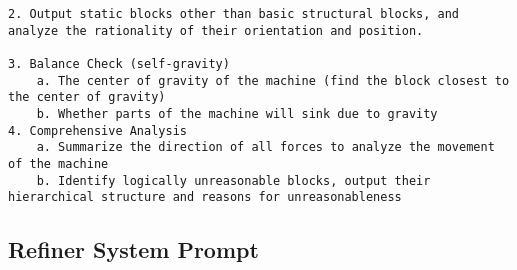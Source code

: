 \begin{lstlisting}
2. Output static blocks other than basic structural blocks, and analyze the rationality of their orientation and position.

3. Balance Check (self-gravity)
    a. The center of gravity of the machine (find the block closest to the center of gravity)
    b. Whether parts of the machine will sink due to gravity
4. Comprehensive Analysis
    a. Summarize the direction of all forces to analyze the movement of the machine
    b. Identify logically unreasonable blocks, output their hierarchical structure and reasons for unreasonableness
\end{lstlisting}

\subsection{Refiner System Prompt}
